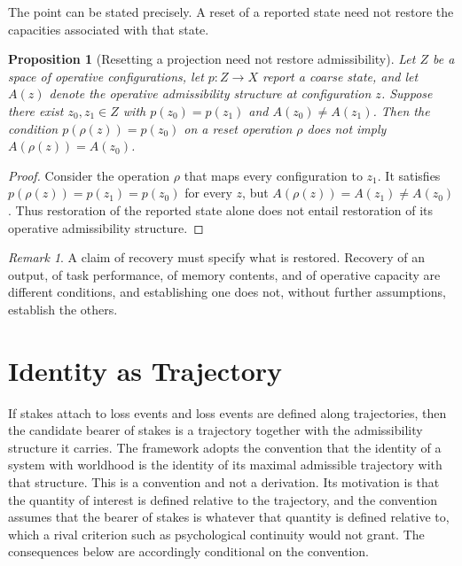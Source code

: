 \documentclass[11pt]{article}
\theoremstyle{definition}
\theoremstyle{plain}
\newtheorem{proposition}{Proposition}
\theoremstyle{remark}
\newtheorem*{remark}{Remark}
\begin{document}
The point can be stated precisely. A reset of a reported state need not restore the capacities associated with that state.

\begin{proposition}[Resetting a projection need not restore admissibility]
Let $Z$ be a space of operative configurations, let $p : Z \to X$ report a coarse state, and let $A(z)$ denote the operative admissibility structure at configuration $z$. Suppose there exist $z_0, z_1 \in Z$ with $p(z_0) = p(z_1)$ and $A(z_0) \neq A(z_1)$. Then the condition $p(\rho(z)) = p(z_0)$ on a reset operation $\rho$ does not imply $A(\rho(z)) = A(z_0)$.
\end{proposition}

\begin{proof}
Consider the operation $\rho$ that maps every configuration to $z_1$. It satisfies $p(\rho(z)) = p(z_1) = p(z_0)$ for every $z$, but $A(\rho(z)) = A(z_1) \neq A(z_0)$. Thus restoration of the reported state alone does not entail restoration of its operative admissibility structure.
\end{proof}

\begin{remark}
A claim of recovery must specify what is restored. Recovery of an output, of task performance, of memory contents, and of operative capacity are different conditions, and establishing one does not, without further assumptions, establish the others.
\end{remark}

\section{Identity as Trajectory}

If stakes attach to loss events and loss events are defined along trajectories, then the candidate bearer of stakes is a trajectory together with the admissibility structure it carries. The framework adopts the convention that the identity of a system with worldhood is the identity of its maximal admissible trajectory with that structure. This is a convention and not a derivation. Its motivation is that the quantity of interest is defined relative to the trajectory, and the convention assumes that the bearer of stakes is whatever that quantity is defined relative to, which a rival criterion such as psychological continuity would not grant. The consequences below are accordingly conditional on the convention.
\end{document}
